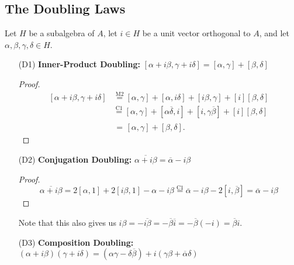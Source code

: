 \documentclass[10pt]{amsart}
\renewcommand{\bar}{\overline}
\newcommand{\norm}[1]{\left[#1\right]}
\begin{document}
\subsection{The Doubling Laws}
Let $H$ be a subalgebra of $A$, let $i \in H$ be a unit vector orthogonal to $A$, and let $\alpha, \beta, \gamma, \delta \in H$.
\begin{enumerate}
\item[(D1)] \textbf{Inner-Product Doubling:}
$
\norm{\alpha + i\beta, \gamma + i \delta} = \norm{\alpha, \gamma} + \norm{\beta, \delta}
$

\begin{proof}
\begin{align*}
\norm{\alpha + i\beta, \gamma + i \delta}
&\overset{\text{M2}}{=}
\norm{\alpha, \gamma} + \norm{\alpha, i\delta} + \norm{i\beta, \gamma} + \norm{i}\norm{\beta, \delta}
\\
&\overset{\text{C1}}{=} \norm{\alpha, \gamma} + \norm{\alpha\bar{\delta}, i} + \norm{i, \gamma \bar{\beta}} + \norm{i}\norm{\beta,\delta}
\\
&\overset{\phantom{\text{M}2}}{=}
\norm{\alpha, \gamma} + \norm{\beta,\delta}.
\end{align*}
\end{proof}

\item[(D2)] \textbf{Conjugation Doubling:}
$
\bar{\alpha + i \beta} = \bar{\alpha} - i\beta
$

\begin{proof}
$$
\bar{\alpha + i\beta} = 2\norm{\alpha,1} + 2\norm{i\beta,1} - \alpha - i\beta \overset{\text{C1}}{=} \bar{\alpha} - i\beta - 2\norm{i,\bar{\beta}} = \bar{\alpha} - i\beta
$$
\end{proof}
\noindent
Note that this also gives us $i\beta = -\bar{i \beta} = -\bar{\beta} \bar{i} = -\bar{\beta}(-i) = \bar{\beta}i$.
\item[(D3)] \textbf{Composition Doubling:}
$(\alpha + i\beta)(\gamma + i\delta) = (\alpha \gamma - \delta \bar{\beta}) + i(\gamma \beta + \bar{\alpha}\delta)$


\end{enumerate}
\end{document}
